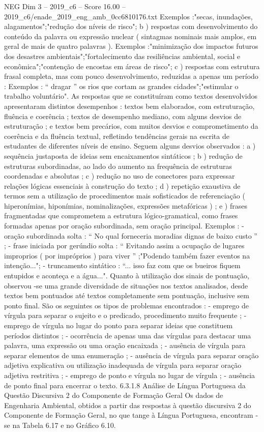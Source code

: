 \begin{textsample}{NEG Dim 3 – 2019\_c6 – Score 16.00 – 2019\_c6/enade\_2019\_eng\_amb\_0cc6810176.txt}
Exemplos :"secas, inundações, alagamentos";"redução dos níveis de risco"; b ) respostas com desenvolvimento do conteúdo da palavra ou expressão nuclear ( sintagmas nominais mais amplos, em geral de mais de quatro palavras ).
Exemplos :"minimização dos impactos futuros dos desastres ambientais";"fortalecimento das resiliências ambiental, social e econômica";"contenção de encostas em áreas de risco"; c ) respostas com estrutura frasal completa, mas com pouco desenvolvimento, reduzidas a apenas um período : Exemplos : “ dragar ” os rios que cortam as grandes cidades";"estimular o trabalho voluntário".
As respostas que se constituíram como textos desenvolvidos apresentaram distintos desempenhos : textos bem elaborados, com estruturação, fluência e coerência ; textos de desempenho mediano, com alguns desvios de estruturação ; e textos bem precários, com muitos desvios e comprometimento da coerência e da fluência textual, refletindo tendências gerais na escrita de estudantes de diferentes níveis de ensino.
Seguem alguns desvios observados : a ) sequência justaposta de ideias sem encaixamentos sintáticos ; b ) redução de estruturas subordinadas, ao lado do aumento na frequência de estruturas coordenadas e absolutas ; c ) redução no uso de conectores para expressar relações lógicas essenciais à construção do texto ; d ) repetição exaustiva de termos sem a utilização de procedimentos mais sofisticados de referenciação ( hiperonímias, hiponímias, nominalizações, expressões metafóricas ) ; e ) frases fragmentadas que comprometem a estrutura lógico-gramatical, como frases formadas apenas por oração subordinada, sem oração principal.
Exemplos : - oração subordinada solta : “ No qual forneceria moradias dignas de baixo custo ” ; - frase iniciada por gerúndio solta : “ Evitando assim a ocupação de lugares improprios ( por impróprios ) para viver ” ;"Podendo também fazer eventos na intenção..."; - truncamento sintático : “... isso faz com que os bueiros fiquem entupidos e aconteça e a água...".
Quanto à utilização dos sinais de pontuação, observou -se uma grande diversidade de situações nos textos analisados, desde textos bem pontuados até textos completamente sem pontuação, inclusive sem ponto final.
São os seguintes os tipos de problemas encontrados : - emprego de vírgula para separar o sujeito e o predicado, procedimento muito frequente ; - emprego de vírgula no lugar do ponto para separar ideias que constituem períodos distintos ; - ocorrência de apenas uma das vírgulas para destacar uma palavra, uma expressão ou uma oração encaixada ; - ausência de vírgula para separar elementos de uma enumeração ; - ausência de vírgula para separar oração adjetiva explicativa ou utilização inadequada de vírgula para separar oração adjetiva restritiva ; - emprego de ponto e vírgula no lugar de vírgula ; - ausência de ponto final para encerrar o texto. 6.3.1.8 Análise de Língua Portuguesa da Questão Discursiva 2 do Componente de Formação Geral Os dados de Engenharia Ambiental, obtidos a partir das respostas à questão discursiva 2 do Componente de Formação Geral, no que tange à Língua Portuguesa, encontram -se na Tabela 6.17 e no Gráfico 6.10.

\end{textsample}
